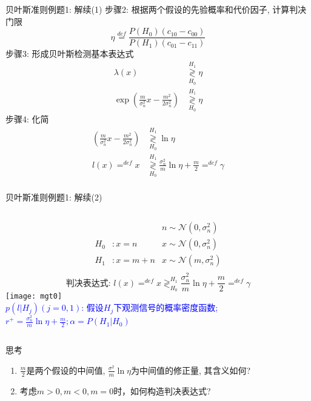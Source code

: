 \begin{frame}[shrink]{贝叶斯准则例题1: 解续(1)}
步骤2: 根据两个假设的先验概率和代价因子, 计算判决门限
\[\eta\mathop{=}\limits^{def}\frac{P(H_0)(c_{10}-c_{00})}{P(H_1)(c_{01}-c_{11})} \]
步骤3: 形成贝叶斯检测基本表达式
\begin{align*}
\lambda(x)&\mathop{\gtrless}\limits_{H_0}^{H_1}\eta\\
\exp\left(\frac{m}{\sigma_n^2}x-\frac{m^2}{2\sigma_n^2}\right)&\mathop{\gtrless}\limits_{H_0}^{H_1}\eta
\end{align*} 
步骤4: 化简
\begin{align*}
\left(\frac{m}{\sigma_n^2}x-\frac{m^2}{2\sigma_n^2}\right)&\mathop{\gtrless}\limits_{H_0}^{H_1}\ln\eta\\
l(x)\mathop{=}^{def}x&\mathop{\gtrless}\limits_{H_0}^{H_1}\frac{\sigma_n^2}{m}\ln\eta+\frac{m}{2}\mathop{=}^{def}\gamma\\
\end{align*} 
\end{frame}

\begin{frame}[shrink]{贝叶斯准则例题1: 解续(2)}
\begin{columns}
	\begin{align*}
	&&n\sim\mathcal{N}(0,\sigma_n^2)\\ 
	H_0 &:x=n   &x\sim\mathcal{N}(0,\sigma_n^2)\\
	H_1 &:x=m+n &x\sim\mathcal{N}(m,\sigma_n^2)\\
	\end{align*}
	\[\text{判决表达式:  } l(x)\mathop{=}^{def}x\mathop{\gtrless}_{H_0}^{H_1}\frac{\sigma_n^2}{m}\ln\eta+\frac{m}{2}\mathop{=}^{def}\gamma \]
	\texttt{[image: mgt0]}\\
	\scriptsize
	\textcolor{blue}{$p(l|H_j)(j=0,1)$: 假设$H_j$下观测信号的概率密度函数; $r^+=\frac{\sigma_n^2}{m}\ln\eta+\frac{m}{2}; \alpha=P(H_1|H_0)$}
\end{columns}
\begin{block}{思考}
	\begin{enumerate}
		\item $\frac{m}{2}$是两个假设的中间值, $\frac{\sigma^2}{m}\ln\eta$为中间值的修正量, 其含义如何?
		\item 考虑$m>0,m<0,m=0$时，如何构造判决表达式?
	\end{enumerate} 
\end{block}
\end{frame}

